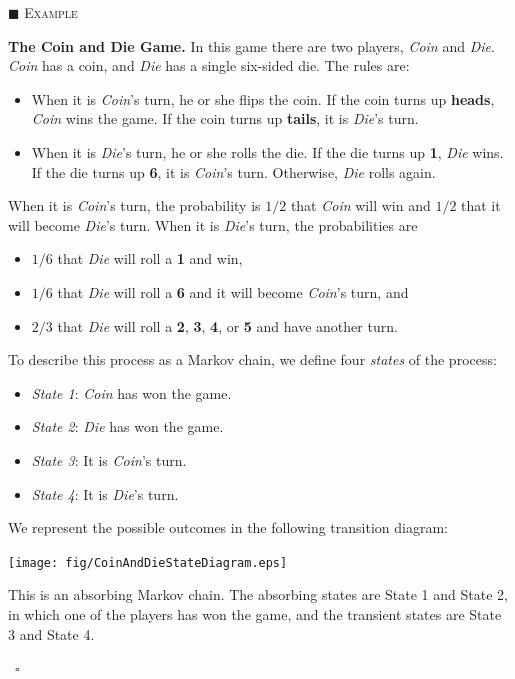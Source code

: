 \documentclass[reqno]{immbook}
\numberwithin{equation}{chapter}
\numberwithin{question}{section}
\numberwithin{theorem}{chapter}
\numberwithin{figure}{chapter}
\theoremstyle{definition}
\newenvironment{xexample}%
{%

\medskip\noindent\addtocounter{example}{1}$\blacksquare$ \textsc{Example \theexample}\hspace*{1em}%
}%
{%
~\hfill$\square$

\medskip
}
\begin{document}
\begin{xexample}
\textbf{The Coin and Die Game.}
In this game there are two players, \emph{Coin}
and \emph{Die}. \emph{Coin} has a coin, and \emph{Die} has a
single six-sided die. The rules are:

\begin{itemize}
\item
When it is \emph{Coin}'s turn, he or she flips the coin.
If the coin turns up \textbf{heads}, \emph{Coin} wins the game.
If the coin turns up \textbf{tails}, it is \emph{Die}'s turn.

\item
When it is \emph{Die}'s turn, he or she rolls the die.
If the die turns up \textbf{1}, \emph{Die} wins.
If the die turns up \textbf{6}, it is \emph{Coin}'s turn.
Otherwise, \emph{Die} rolls again.
\end{itemize}

\noindent
When it is \emph{Coin}'s turn, the probability
is $1/2$ that \emph{Coin} will win and $1/2$ that
it will become \emph{Die}'s turn.
When it is \emph{Die}'s turn, the probabilities are
\begin{itemize}
\item $1/6$ that \emph{Die} will roll a \textbf{1} and win,
\item $1/6$ that \emph{Die} will roll a \textbf{6}
      and it will become \emph{Coin}'s turn, and
\item $2/3$ that \emph{Die} will
roll a \textbf{2}, \textbf{3}, \textbf{4}, or \textbf{5} and
have another turn.
\end{itemize}

\noindent
To describe this process as a Markov chain, we define
four \emph{states} of the process:
\begin{itemize}
\item \emph{State 1}: \emph{Coin} has won the game.
\item \emph{State 2}: \emph{Die} has won the game.
\item \emph{State 3}: It is \emph{Coin}'s turn.
\item \emph{State 4}: It is \emph{Die}'s turn.
\end{itemize}
We represent the possible outcomes in
the following transition diagram:

\medskip
\centerline{%
\texttt{[image: fig/CoinAndDieStateDiagram.eps]}
}

\medskip
\noindent
This is an absorbing Markov chain.  The absorbing
states are State 1 and State 2, in which one of the players
has won the game, and the transient states
are State 3 and State 4.


\end{xexample}
\end{document}
